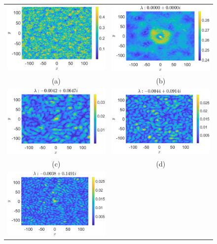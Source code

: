 \documentclass[aps,prl,preprint,groupedaddress]{revtex4-1}
\begin{document}
\begin{figure}[!ht]
\centering
\begin{tabular}{cc}
\includegraphics[width=.51\textwidth]{amplitude_wwt_K_256_Lx_128_tf_1pt5e4} &\hspace{-15pt} \includegraphics[width=.51\textwidth]{mean_wwt_K_256_Lx_128_tf_1pt5e4} \\
(a) & (b)\\
\includegraphics[width=.51\textwidth]{osc1_wwtforce_K_256_Lx_128_tf_1_pt5e4} &\hspace{-15pt} \includegraphics[width=.51\textwidth]{osc2_wwtforce_K_256_Lx_128_tf_1_pt5e4} \\
(c) & (d)\\
\includegraphics[width=.51\textwidth]{osc3_wwtforce_K_256_Lx_128_tf_1_pt5e4} & \\

\end{tabular}
\end{figure}
\end{document}
